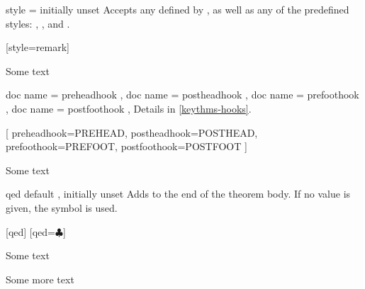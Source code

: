 \documentclass{ltxdoc}
\begin{document}
\begin{docKey}{style}
  {=}
  {initially unset}
Accepts any  defined by , as well as any of the predefined  styles: , , and .

\begin{codepreamble}
[style=remark]
\end{codepreamble}

\begin{keythmscode}[withpreamble]
\begin{remark}
Some text
\end{remark}
\end{keythmscode}

\end{docKey}

\begin{docKeys}[
  doc parameter = {=\meta{code}},
  doc description = initially unset,
  ]
  {
    { doc name = preheadhook },
    { doc name = postheadhook },
    { doc name = prefoothook },
    { doc name = postfoothook },
  }
Details in \autoref{keythms-hooks}.

\begin{codepreamble}
[
  preheadhook=PREHEAD,
  postheadhook=POSTHEAD,
  prefoothook=PREFOOT,
  postfoothook=POSTFOOT
]
\end{codepreamble}

\begin{keythmscode}[withpreamble]
\begin{test}
Some text
\end{test}
\end{keythmscode}

\end{docKeys}

\begin{docKey}{qed}
  {}
  {default , initially unset}
Adds  to the end of the theorem body.
If no value is given, the symbol \qedsymbol{} is used.

\begin{codepreamble}
[qed]
[qed=$\clubsuit$]
\end{codepreamble}

\begin{keythmscode}[withpreamble]
\begin{example}
Some text
\end{example}
\begin{solution}
Some more text
\end{solution}
\end{keythmscode}

\end{docKey}
\end{document}
